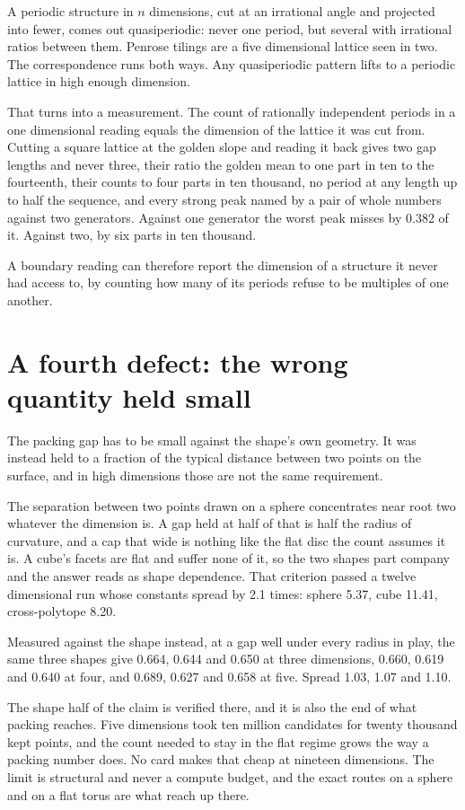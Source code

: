 A periodic structure in $n$ dimensions, cut at an irrational angle and projected into fewer, comes
out quasiperiodic: never one period, but several with irrational ratios between them. Penrose
tilings are a five dimensional lattice seen in two. The correspondence runs both ways. Any
quasiperiodic pattern lifts to a periodic lattice in high enough dimension.

That turns into a measurement. The count of rationally independent periods in a one dimensional
reading equals the dimension of the lattice it was cut from. Cutting a square lattice at the golden
slope and reading it back gives two gap lengths and never three, their ratio the golden mean to one
part in ten to the fourteenth, their counts to four parts in ten thousand, no period at any length
up to half the sequence, and every strong peak named by a pair of whole numbers against two
generators. Against one generator the worst peak misses by 0.382 of it. Against two, by six parts in
ten thousand.

A boundary reading can therefore report the dimension of a structure it never had access to, by counting
how many of its periods refuse to be multiples of one another.

\section{A fourth defect: the wrong quantity held small}

The packing gap has to be small against the shape's own geometry. It was instead held to a fraction
of the typical distance between two points on the surface, and in high dimensions those are not the
same requirement.

The separation between two points drawn on a sphere concentrates near root two whatever the
dimension is. A gap held at half of that is half the radius of curvature, and a cap that wide is
nothing like the flat disc the count assumes it is. A cube's facets are flat and suffer none of it,
so the two shapes part company and the answer reads as shape dependence. That criterion passed a
twelve dimensional run whose constants spread by 2.1 times: sphere 5.37, cube 11.41, cross-polytope
8.20.

Measured against the shape instead, at a gap well under every radius in play, the same three shapes
give 0.664, 0.644 and 0.650 at three dimensions, 0.660, 0.619 and 0.640 at four, and 0.689, 0.627
and 0.658 at five. Spread 1.03, 1.07 and 1.10.

The shape half of the claim is verified there, and it is also the end of what packing reaches. Five
dimensions took ten million candidates for twenty thousand kept points, and the count needed to stay
in the flat regime grows the way a packing number does. No card makes that cheap at nineteen
dimensions. The limit is structural and never a compute budget, and the exact routes on a sphere and
on a flat torus are what reach up there.

